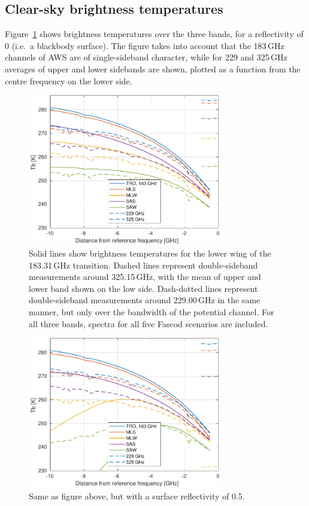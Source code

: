 \documentclass[12pt]{article}
\begin{document}
\subsection{Clear-sky brightness temperatures}
%
Figure~\ref{fig:tb:r000} shows brightness temperatures over the three bands, for
a reflectivity of 0 (i.e.\ a blackbody surface). The figure takes into account
that the 183\,GHz channels of AWS are of single-sideband character, while for
229 and 325\,GHz averages of upper and lower sidebands are shown, plotted as
a function from the centre frequency on the lower side.

\begin{figure}[p]
  \centering
  \includegraphics[width=0.75\textwidth]{fascod_tb_r000}
  \caption{Solid lines show brightness temperatures for the lower wing of the
    183.31\,GHz transition. Dashed lines represent double-sideband measurements
    around 325.15\,GHz, with the mean of upper and lower band shown on the low
    side. Dash-dotted lines represent double-sideband measurements around
    229.00\,GHz in the same manner, but only over the bandwidth of the
    potential channel. For all three bands, spectra for all five
    Fascod scenarios are included.}
  \label{fig:tb:r000}
\end{figure}
\begin{figure}[p]
  \centering
  \includegraphics[width=0.75\textwidth]{fascod_tb_r050}
  \caption{Same as figure above, but with a surface reflectivity of 0.5.}
  \label{fig:tb:r050}
\end{figure}
\end{document}
